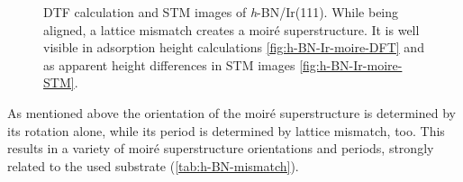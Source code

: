 	\begin{figure} \centering
		 \quad
		\caption{DTF calculation and STM images of \textit{h}-BN/Ir(111). While being aligned, a lattice mismatch creates a moir\'e  superstructure. It is well visible in adsorption height calculations \ref{fig:h-BN-Ir-moire-DFT} and as apparent height differences in STM images \ref{fig:h-BN-Ir-moire-STM}.}
		\label{fig:moire-DFT-TSM}
	\end{figure}

As mentioned above the orientation of the moir\'e superstructure is determined by its rotation alone, while its period is determined by lattice mismatch, too. This results in a variety of moir\'e superstructure orientations and periods, strongly related to the used substrate (\autoref{tab:h-BN-mismatch}).

	

